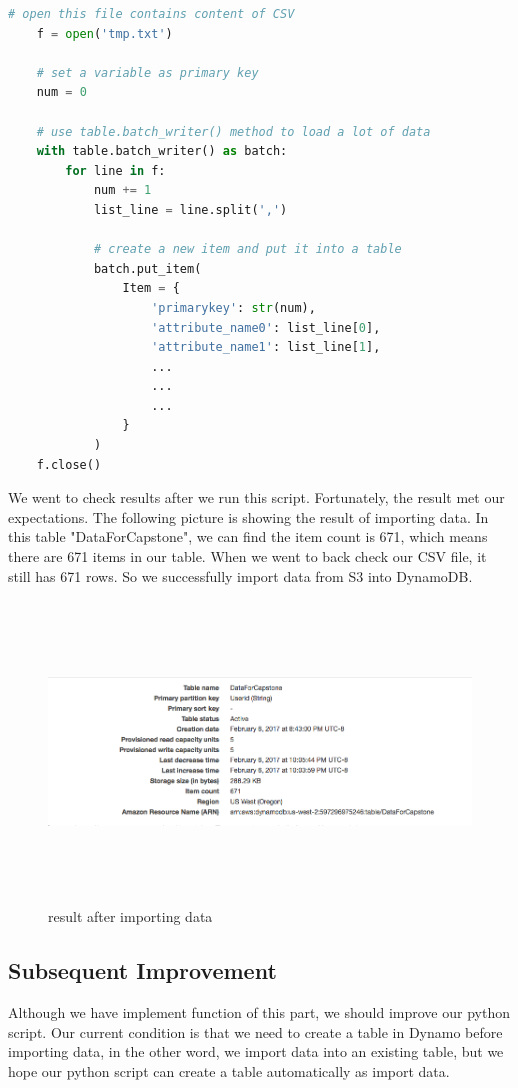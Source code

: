 \begin{lstlisting}[language=Python, caption=importing data]
	# open this file contains content of CSV
	f = open('tmp.txt')

	# set a variable as primary key
	num = 0

	# use table.batch_writer() method to load a lot of data
	with table.batch_writer() as batch:
		for line in f:
			num += 1
			list_line = line.split(',')
		
			# create a new item and put it into a table
			batch.put_item(
				Item = {
					'primarykey': str(num),
					'attribute_name0': list_line[0],
					'attribute_name1': list_line[1],
					...
					...
					...
				}
			)
	f.close()
\end{lstlisting}

\noindent We went to check results after we run this script. Fortunately, the result met our expectations. The following picture is showing the result of importing data. In this table "DataForCapstone", we can find the item count is 671, which means there are 671 items in our table. When we went to back check our CSV file, it still has 671 rows. So we successfully import data from S3 into DynamoDB.

 \begin{figure}[H]
 \includegraphics[width=17cm, height=8cm]{result.png}
 \centering
 \caption{\label{fig:4}result after importing data}
 \end{figure}

\subsection{Subsequent Improvement}
Although we have implement function of this part, we should improve our python script. Our current condition is that we need to create a table in Dynamo before importing data, in the other word, we import data into an existing table, but we hope our python script can create a table automatically as import data.\\

